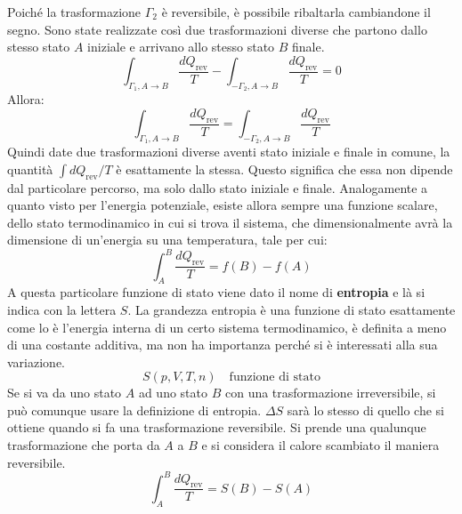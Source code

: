 \documentclass[10pt,a4paper]{book}
\begin{document}
Poiché la trasformazione $\Gamma_2$ è reversibile, è possibile ribaltarla cambiandone il segno. Sono state realizzate così due trasformazioni diverse che partono dallo stesso stato $A$ iniziale e arrivano allo stesso stato $B$ finale.
\[
	\int_{\Gamma_1, A\to B} \frac{dQ_{\text{rev} } }{T} - \int_{-\Gamma_2, A\to B} \frac{dQ_{\text{rev} } }{T} = 0
\]
Allora:
\[
	\int_{\Gamma_1, A\to B} \frac{dQ_{\text{rev} } }{T} = \int_{-\Gamma_2, A\to B} \frac{dQ_{\text{rev} } }{T}
\]
Quindi date due trasformazioni diverse aventi stato iniziale e finale in comune, la quantità $\int dQ_\text{rev}/T$ è esattamente la stessa. Questo significa che essa non dipende dal particolare percorso, ma solo dallo stato iniziale e finale. Analogamente a quanto visto per l'energia potenziale, esiste allora sempre una funzione scalare, dello stato termodinamico in cui si trova il sistema, che dimensionalmente avrà la dimensione di un'energia su una temperatura, tale per cui:
\[
	\int_A^B \frac{dQ_{\text{rev} } }{T} = f(B) - f(A)
\]
A questa particolare funzione di stato viene dato il nome di \textbf{entropia} e là si indica con la lettera $S$.
La grandezza entropia è una funzione di stato esattamente come lo è l'energia interna di un certo sistema termodinamico, è definita a meno di una costante additiva, ma non ha importanza perché si è interessati alla sua variazione.
\[
	S(p,V,T,n) \quad \text{funzione di stato}
\]
Se si va da uno stato $A$ ad uno stato $B$ con una trasformazione irreversibile, si può comunque usare la definizione di entropia. $\Delta S$ sarà lo stesso di quello che si ottiene quando si fa una trasformazione reversibile. Si prende una qualunque trasformazione che porta da $A$ a $B$ e si considera il calore scambiato il maniera reversibile.
\[
	\int_A^B \frac{dQ_{\text{rev} } }{T} = S(B) - S(A)
\]
\end{document}
